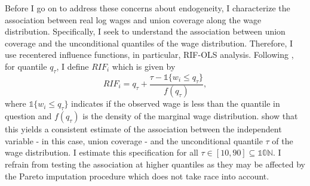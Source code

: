 \documentclass[11pt]{article}
\begin{document}
Before I go on to address these concerns about endogeneity, I characterize the association between real log wages and union coverage along the wage distribution. Specifically, I seek to understand the association between union coverage and the unconditional quantiles of the wage distribution. Therefore, I use recentered influence functions, in particular, RIF-OLS analysis. Following \citet{ffl2009}, for quantile $q_\tau$, I define $RIF_i$ which is given by 
\begin{equation}\label{eq:rif}
    RIF_i = q_\tau + \frac{\tau - \mathbb{1}\{w_i \leq q_\tau\}}{f(q_\tau)},
\end{equation}
where $\mathbb{1}\{w_i \leq q_\tau\}$ indicates if the observed wage is less than the quantile in question and $f(q_\tau)$ is the density of the marginal wage distribution. \citet{ffl2009} show that this yields a consistent estimate of the association between the independent variable - in this case, union coverage - and the unconditional quantile $\tau$ of the wage distribution. I estimate this specification for all $\tau \in [10,90]\subseteq \mathbb{10N}$. I refrain from testing the association at higher quantiles as they may be affected by the Pareto imputation procedure which does not take race into account. 
\end{document}
